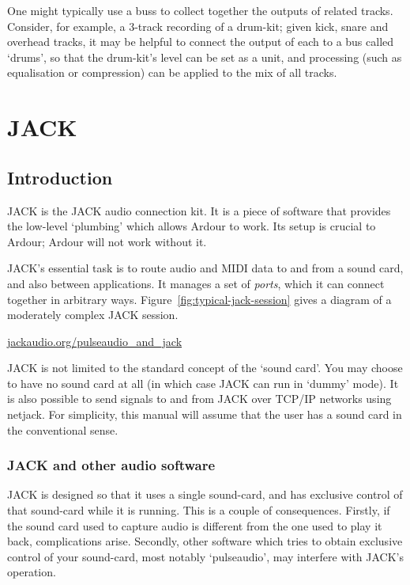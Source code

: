 \documentclass[10pt,a4paper]{book}
\begin{document}
One might typically use a buss to collect together the outputs of
related tracks.  Consider, for example, a 3-track recording of a
drum-kit; given kick, snare and overhead tracks, it may be helpful to
connect the output of each to a bus called `drums', so that the
drum-kit's level can be set as a unit, and processing (such as
equalisation or compression) can be applied to the mix of all tracks.


\chapter{JACK}
\label{ch:jack}

\section{Introduction}

JACK is the JACK audio connection kit.  It is a piece of software that
provides the low-level `plumbing' which allows Ardour to work.  Its
setup is crucial to Ardour; Ardour will not work without it.

JACK's essential task is to route audio and MIDI data to and from a
sound card, and also between applications.  It manages a set of
\emph{ports}, which it can connect together in arbitrary ways.
Figure~\ref{fig:typical-jack-session} gives a diagram of a moderately
complex JACK session.

\url{jackaudio.org/pulseaudio_and_jack}

\begin{danger}
JACK is not limited to the standard concept of the `sound card'.  You
may choose to have no sound card at all (in which case JACK can run in
`dummy' mode).  It is also possible to send signals to and from JACK
over TCP/IP networks using netjack.  For simplicity, this manual will
assume that the user has a sound card in the conventional sense.
\end{danger}

\subsection{JACK and other audio software}

JACK is designed so that it uses a single sound-card, and has
exclusive control of that sound-card while it is running.  This is a
couple of consequences.  Firstly, if the sound card used to capture
audio is different from the one used to play it back, complications
arise.  Secondly, other software which tries to obtain exclusive
control of your sound-card, most notably `pulseaudio', may interfere
with JACK's operation.
\end{document}
